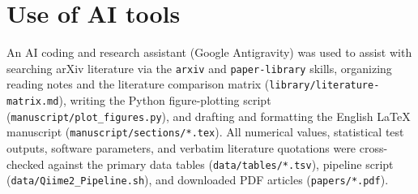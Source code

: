 \section*{Use of AI tools}
An AI coding and research assistant (Google Antigravity) was used to assist with searching arXiv literature via the \texttt{arxiv} and \texttt{paper-library} skills, organizing reading notes and the literature comparison matrix (\texttt{library/literature-matrix.md}), writing the Python figure-plotting script (\texttt{manuscript/plot\_figures.py}), and drafting and formatting the English LaTeX manuscript (\texttt{manuscript/sections/*.tex}). All numerical values, statistical test outputs, software parameters, and verbatim literature quotations were cross-checked against the primary data tables (\texttt{data/tables/*.tsv}), pipeline script (\texttt{data/Qiime2\_Pipeline.sh}), and downloaded PDF articles (\texttt{papers/*.pdf}).
